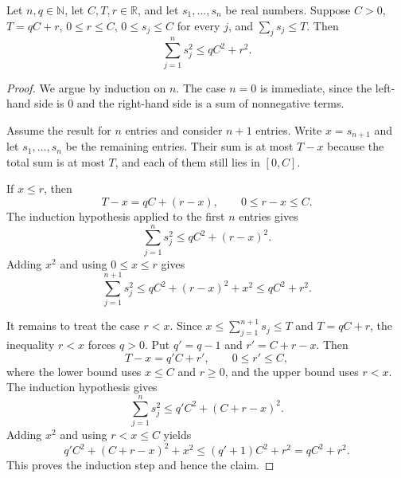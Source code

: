 \begin{helper}
Let $n,q\in\mathbb N$, let $C,T,r\in\mathbb R$, and let
$s_1,\ldots,s_n$ be real numbers.  Suppose $C>0$, $T=qC+r$,
$0\le r\le C$, $0\le s_j\le C$ for every $j$, and
$\sum_j s_j\le T$.  Then
\[
\sum_{j=1}^n s_j^2\le qC^2+r^2 .
\]
\end{helper}
\begin{proof}
We argue by induction on $n$.  The case $n=0$ is immediate, since the
left-hand side is $0$ and the right-hand side is a sum of nonnegative terms.

Assume the result for $n$ entries and consider $n+1$ entries.  Write
$x=s_{n+1}$ and let $s_1,\ldots,s_n$ be the remaining entries.  Their sum is
at most $T-x$ because the total sum is at most $T$, and each of them still
lies in $[0,C]$.

If $x\le r$, then
\[
T-x=qC+(r-x),\qquad 0\le r-x\le C .
\]
The induction hypothesis applied to the first $n$ entries gives
\[
\sum_{j=1}^n s_j^2\le qC^2+(r-x)^2 .
\]
Adding $x^2$ and using $0\le x\le r$ gives
\[
\sum_{j=1}^{n+1}s_j^2
\le qC^2+(r-x)^2+x^2
\le qC^2+r^2 .
\]

It remains to treat the case $r<x$.  Since $x\le\sum_{j=1}^{n+1}s_j\le T$
and $T=qC+r$, the inequality $r<x$ forces $q>0$.  Put $q'=q-1$ and
$r'=C+r-x$.  Then
\[
T-x=q'C+r',\qquad 0\le r'\le C,
\]
where the lower bound uses $x\le C$ and $r\ge0$, and the upper bound uses
$r<x$.  The induction hypothesis gives
\[
\sum_{j=1}^n s_j^2\le q'C^2+(C+r-x)^2 .
\]
Adding $x^2$ and using $r<x\le C$ yields
\[
q'C^2+(C+r-x)^2+x^2
\le (q'+1)C^2+r^2
=qC^2+r^2 .
\]
This proves the induction step and hence the claim.
\end{proof}

